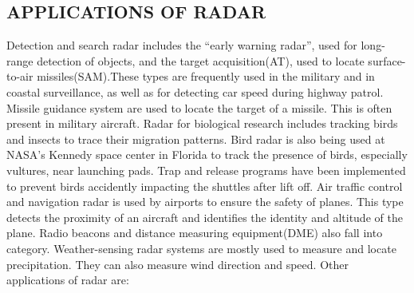 \documentclass[12pt]{article} %
\begin{document}
\subsection{APPLICATIONS OF RADAR}
Detection and search radar includes the “early warning radar”, used for long-range detection of objects, and the target acquisition(AT), used to locate surface-to-air missiles(SAM).These types are frequently used in the military and in coastal surveillance, as well as for detecting car speed during highway patrol.
Missile guidance system are used to locate the target of a missile. This is often present in military aircraft.
Radar for biological research includes tracking birds and insects to trace their migration patterns. Bird radar is also being used at NASA’s Kennedy space center in Florida to track the presence of birds, especially vultures, near launching pads. Trap and release programs have been implemented to prevent birds accidently impacting the shuttles after lift off.
Air traffic control and navigation radar is used by airports to ensure the safety of planes. This type detects the proximity of an aircraft and identifies the identity and altitude of the plane. Radio beacons and distance measuring equipment(DME) also fall into category.
Weather-sensing radar systems are mostly used to measure and locate precipitation. They can also measure wind direction and speed. 
         Other applications of radar are:
\end{document}
